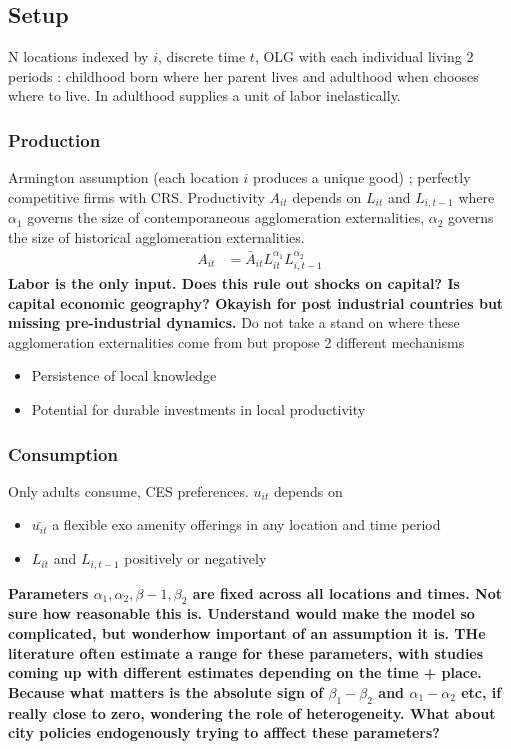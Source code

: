 \documentclass[12pt, final]{article}
\def\a{\alpha}
\begin{document}
\subsection{Setup} %
\label{sub:setup}
N locations indexed by $i$, discrete time $t$, OLG with each individual living 2 periods : childhood born where her parent lives and adulthood when chooses where to live. In adulthood supplies a unit of labor inelastically.

\subsubsection{Production} %
\label{ssub:production}

Armington assumption (each location $i$ produces a unique good) ; perfectly competitive firms with CRS.
Productivity $A_{it}$ depends on $L_{it}$ and $L_{i,t-1}$ where $\a_1$ governs the size of contemporaneous agglomeration externalities, $\a_2$ governs the size of historical agglomeration externalities.
\begin{align*}
    A_{it} &= \bar{A}_{it} L_{it}^{\alpha_1} L_{i,t-1}^{\alpha_2}
\end{align*}
\textbf{Labor is the only input. Does this rule out shocks on capital? Is capital economic geography? Okayish for post industrial countries but missing pre-industrial dynamics.}
Do not take a stand on where these agglomeration externalities come from but propose 2 different mechanisms
\begin{itemize}
    \item Persistence of local knowledge
    \item Potential for durable investments in local productivity
\end{itemize}


\subsubsection{Consumption} %
\label{ssub:consumption}

Only adults consume, CES preferences. $u_{it}$ depends on 
\begin{itemize}
    \item $\bar{u_{it}}$ a flexible exo amenity offerings in any location and time period
    \item $L_{it}$ and $L_{i,t-1}$ positively or negatively
\end{itemize}
\textbf{Parameters $\alpha_1, \alpha_2, \beta-1, \beta_2$ are fixed across all locations and times. Not sure how reasonable this is. Understand would make the model so complicated, but wonderhow important of an assumption it is. THe literature often estimate a range for these parameters, with studies coming up with different estimates depending on the time + place. Because what matters is the absolute sign of $\beta_1 - \beta_2$ and $\alpha_1 - \alpha_2$ etc, if really close to zero, wondering the role of heterogeneity. What about city policies endogenously trying to afffect these parameters?}
\end{document}
